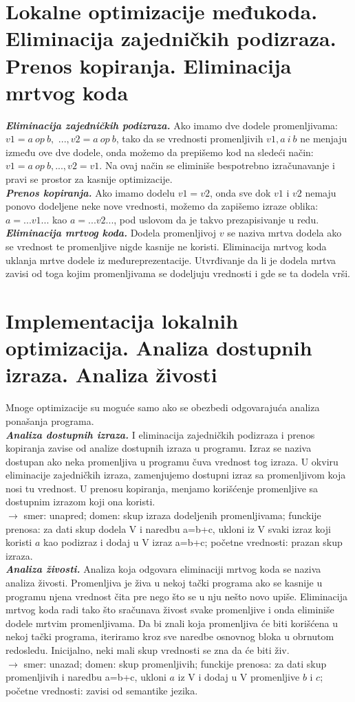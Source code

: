 \documentclass[10pt]{extarticle}
\begin{document}
\section{Lokalne optimizacije međukoda. Eliminacija zajedničkih podizraza. Prenos kopiranja. Eliminacija mrtvog koda}
\noindent
\textit{\textbf{Eliminacija zajedničkih podizraza.}} Ako imamo dve dodele promenljivama: $v1 = a\ op\ b,$ $..., v2 = a\ op\ b$, tako da se vrednosti promenljivih $v1, a\ i\ b$ ne menjaju između ove dve dodele, onda možemo da prepišemo kod na sledeći način: $v1 = a\ op\ b, ..., v2 = v1$. Na ovaj način se eliminiše bespotrebno izračunavanje i pravi se prostor za kasnije optimizacije. \\
\textit{\textbf{Prenos kopiranja.}} Ako imamo dodelu $v1 = v2$, onda sve dok $v1$ i $v2$ nemaju ponovo dodeljene neke nove vrednosti, možemo da zapišemo izraze oblika: $a = ...v1...$ kao $a = ...v2...$, pod uslovom da je takvo prezapisivanje u redu. \\
\textit{\textbf{Eliminacija mrtvog koda.}} Dodela promenljivoj $v$ se naziva mrtva dodela ako se vrednost te promenljive nigde kasnije ne koristi. Eliminacija mrtvog koda uklanja mrtve dodele iz  međureprezentacije. Utvrđivanje da li je dodela mrtva zavisi od toga kojim promenljivama se dodeljuju vrednosti i gde se ta dodela vrši.

\section{Implementacija lokalnih optimizacija. Analiza dostupnih izraza. Analiza živosti}
\noindent
Mnoge optimizacije su moguće samo ako se obezbedi odgovarajuća analiza ponašanja programa. \\
\textbf{\textit{Analiza dostupnih izraza.}} I eliminacija zajedničkih podizraza i prenos kopiranja zavise od analize dostupnih izraza u programu. Izraz se naziva dostupan ako neka promenljiva u programu čuva vrednost tog izraza. U okviru eliminacije zajedničkih izraza, zamenjujemo dostupni izraz sa promenljivom koja nosi tu vrednost. U prenosu kopiranja, menjamo korišćenje promenljive sa dostupnim izrazom koji ona koristi.\\
$\rightarrow$ smer: unapred; domen: skup izraza dodeljenih promenljivama; funckije prenosa: za dati skup dodela V i naredbu a=b+c, ukloni iz V svaki izraz koji koristi $a$ kao podizraz i dodaj u V izraz a=b+c; početne vrednosti: prazan skup izraza. \\
\textit{\textbf{Analiza živosti.}} Analiza koja odgovara eliminaciji mrtvog koda se naziva analiza živosti. Promenljiva je živa u nekoj tački programa ako se kasnije u programu njena vrednost čita pre nego što se u nju nešto novo upiše.
Eliminacija mrtvog koda radi tako što sračunava živost svake promenljive i onda eliminiše dodele mrtvim promenljivama. Da bi znali koja promenljiva će biti korišćena u nekoj tački programa, iteriramo kroz sve naredbe osnovnog bloka u obrnutom redosledu. Inicijalno, neki mali skup vrednosti se zna da će biti živ.\\
$\rightarrow$ smer: unazad; domen: skup promenljivih; funckije prenosa: za dati skup promenljivih i naredbu a=b+c, ukloni $a$ iz V i dodaj u V promenljive $b$ i $c$; početne vrednosti: zavisi od semantike jezika. 
\end{document}
